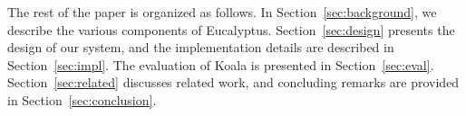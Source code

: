 The rest of the paper is organized as follows.  In Section~\ref{sec:background}, we describe the various components of Eucalyptus.  Section~\ref{sec:design} presents the design of our system, and the implementation details are described in Section~\ref{sec:impl}.  The evaluation of Koala is presented in Section~\ref{sec:eval}.  Section~\ref{sec:related} discusses related work, and concluding remarks are provided in Section~\ref{sec:conclusion}.%


